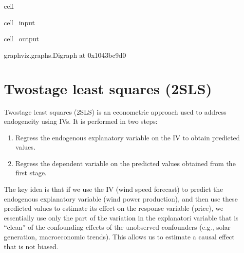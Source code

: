 \documentclass[letterpaper,10pt,english]{jupyterBook}
\begin{document}
\begin{sphinxuseclass}{cell}
\begin{sphinxVerbatimInput}
\begin{sphinxuseclass}{cell_input}
\begin{sphinxVerbatim}[commandchars=\\\{\}]
\end{sphinxVerbatim}

\end{sphinxuseclass}\end{sphinxVerbatimInput}
\begin{sphinxVerbatimOutput}

\begin{sphinxuseclass}{cell_output}
\begin{sphinxVerbatim}[commandchars=\\\{\}]
\PYGZlt{}graphviz.graphs.Digraph at 0x1043bc9d0\PYGZgt{}
\end{sphinxVerbatim}

\end{sphinxuseclass}\end{sphinxVerbatimOutput}

\end{sphinxuseclass}

\section{Two\sphinxhyphen{}stage least squares (2SLS)}
\label{\detokenize{notebooks/instrumental_variables:two-stage-least-squares-2sls}}
\sphinxAtStartPar
Two\sphinxhyphen{}stage least squares (2SLS) is an econometric approach used to address endogeneity using IVs. It is performed in two steps:
\begin{enumerate}
%
\item {} 
\sphinxAtStartPar
Regress the endogenous explanatory variable on the IV to obtain predicted values.

\item {} 
\sphinxAtStartPar
Regress the dependent variable on the predicted values obtained from the first stage.

\end{enumerate}

\sphinxAtStartPar
The key idea is that if we use the IV (wind speed forecast) to predict the endogenous explanatory variable (wind power production), and then use these predicted values to estimate its effect on the response variable (price), we essentially use only the part of the variation in the explanatori variable that is “clean” of the confounding effects of the unobserved confounders (e.g., solar generation, macroeconomic trends). This allows us to estimate a causal effect that is not biased.
\end{document}
